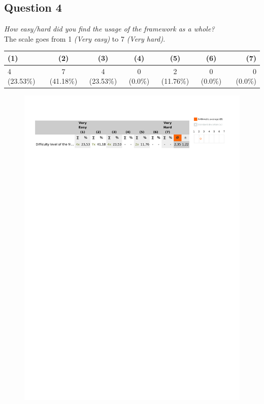 \subsection{Question 4}
\emph{How easy/hard did you find the usage of the framework as a whole?}\\

The scale goes from 1 \emph{(Very easy)} to 7 \emph{(Very hard)}.
\begin{table}[H]
	\begin{center}
		\small \begin{tabular*}{1.15\columnwidth}{lcccccr}
			\\ \hline \hline
			(1) & (2) & (3) & (4) & (5) & (6) & (7) \\ \hline \hline

		 	4 (23.53\%) & 7 (41.18\%) & 4 (23.53\%) & 0 (0.0\%) & 2 (11.76\%) & 0 (0.0\%) & 0 (0.0\%)\\ \hline
		\end{tabular*}
	\end{center}
\end{table}

\begin{figure}[H]
	\centering
	\includegraphics[width=0.6\linewidth]{gfx/Chapter_EvaluationResults/ChildproofTask/question4}
\end{figure}


